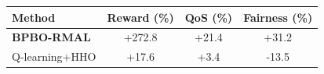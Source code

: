 \begin{tabular}{lccc}
\hline
\textbf{Method} & \textbf{Reward (\%)} & \textbf{QoS (\%)} & \textbf{Fairness (\%)} \\
\hline
\textbf{BPBO-RMAL} & +272.8 & +21.4 & +31.2 \\
Q-learning+HHO & +17.6 & +3.4 & -13.5 \\
\hline
\end{tabular}